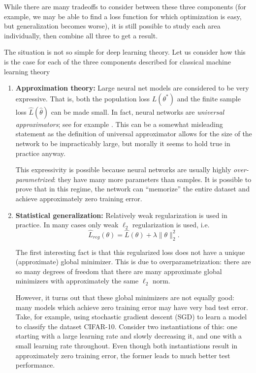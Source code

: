 While there are many tradeoffs to consider between these three components (for example, we may be able to find a loss function for which optimization is easy, but generalization becomes worse), it is still possible to study each area individually, then combine all three to get a result.

The situation is not so simple for deep learning theory. Let us consider how this is the case for each of the three components described for classical machine learning theory

\begin{enumerate} 
\item {\bf Approximation theory:} Large neural net models are considered to be very expressive. That is, both the population loss $L(\theta^*)$ and the finite sample loss $\hat{L}(\hat\theta)$ can be made small. In fact, neural networks are \textit{universal approximators}; see for example \cite{hornik1991}. This can be a somewhat misleading statement as the definition of universal approximator allows for the size of the network to be impracticably large, but morally it seems to hold true in practice anyway.
        
This expressivity is possible because neural networks are usually highly \textit{over-parametrized}: they have many more parameters than samples. It is possible to prove that in this regime, the network can ``memorize'' the entire dataset and achieve approximately zero training error.
    
\item {\bf Statistical generalization:} Relatively weak regularization is used in practice. In many cases only weak $\ell_2$ regularization is used, i.e.
\begin{equation}
\widehat{L}_{reg}(\theta)=\hat{L}(\theta)+\lambda\|\theta\|_2^2.
\end{equation}
    
The first interesting fact is that this regularized loss does not have a unique (approximate) global minimizer. This is due to overparametrization: there are so many degrees of freedom that there are many approximate global minimizers with approximately the same $\ell_2$ norm.
    
However, it turns out that these global minimizers are not equally good: many models which achieve zero training error may have very bad test error. Take, for example, using stochastic gradient descent (SGD) to learn a model to classify the dataset CIFAR-10. Consider two instantiations of this: one starting with a large learning rate and slowly decreasing it, and one with a small learning rate throughout. Even though both instantiations result in approximately zero training error, the former leads to much better test performance.


\end{enumerate}
